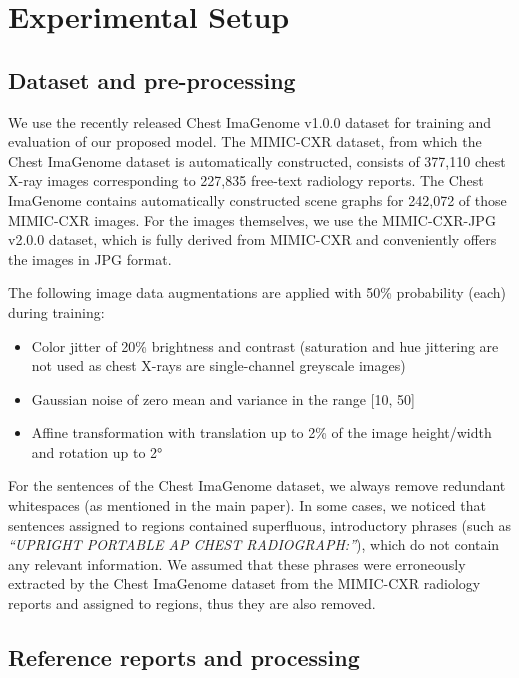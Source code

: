 \documentclass[10pt,twocolumn,letterpaper]{article}
\begin{document}
\section{Experimental Setup}\label{appendix:exp_setup}

\subsection{Dataset and pre-processing}

We use the recently released Chest ImaGenome v1.0.0 \cite{wu2021chest, wu2021chestphysio, PhysioNet} dataset for training and evaluation of our proposed model. The MIMIC-CXR \cite{johnson2019mimic, johnson2019mimicphysio} dataset, from which the Chest ImaGenome dataset is automatically constructed, consists of 377,110 chest X-ray images corresponding to 227,835 free-text radiology reports. The Chest ImaGenome contains automatically constructed scene graphs for 242,072 of those MIMIC-CXR images. For the images themselves, we use the MIMIC-CXR-JPG v2.0.0 \cite{johnson2019mimicjpg, johnson2019mimicjpgphysio} dataset, which is fully derived from MIMIC-CXR and conveniently offers the images in JPG format.

The following image data augmentations are applied with 50\% probability (each) during training:

\begin{itemize}
    \item Color jitter of 20\% brightness and contrast (saturation and hue jittering are not used as chest X-rays are single-channel greyscale images)
    \item Gaussian noise of zero mean and variance in the range [10, 50]
    \item Affine transformation with translation up to 2\% of the image height/width and rotation up to 2°
\end{itemize}

For the sentences of the Chest ImaGenome dataset, we always remove redundant whitespaces (as mentioned in the main paper). In some cases, we noticed that sentences assigned to regions contained superfluous, introductory phrases (such as \emph{“UPRIGHT PORTABLE AP CHEST RADIOGRAPH:”}), which do not contain any relevant information. We assumed that these phrases were erroneously extracted by the Chest ImaGenome dataset from the MIMIC-CXR radiology reports and assigned to regions, thus they are also removed.

\subsection{Reference reports and processing}\label{appendix:report_processing}
\end{document}
